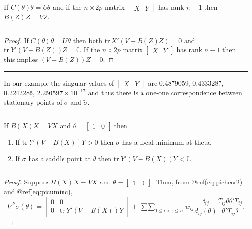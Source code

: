 \documentclass[
  12pt,
  letterpaper,
  DIV=11,
  numbers=noendperiod]{scrreprt}
\providecommand{\tightlist}{%
  \setlength{\itemsep}{0pt}\setlength{\parskip}{0pt}}\usepackage{longtable,booktabs,array}
\theoremstyle{remark}
\begin{document}
\label{pictaround}
If \(C(\theta)\theta=U\theta\) and if the \(n\times 2p\) matrix
\(\begin{bmatrix}X&Y\end{bmatrix}\) has rank \(n-1\) then \(B(Z)Z=VZ\).

\begin{center}\rule{0.5\linewidth}{0.5pt}\end{center}

\begin{proof}
If \(C(\theta)\theta=U\theta\) then both \(\text{tr}\ X'(V-B(Z)Z)=0\)
and \(\text{tr}\ Y'(V-B(Z))Z=0\). If the \(n\times 2p\) matrix
\(\begin{bmatrix}X&Y\end{bmatrix}\) has rank \(n-1\) then this implies
\((V-B(Z))Z=0\).
\end{proof}

\begin{center}\rule{0.5\linewidth}{0.5pt}\end{center}

In our example the singular values of
\(\begin{bmatrix}X&Y\end{bmatrix}\) are 0.4879059, 0.4333287, 0.2242285,
\ensuremath{2.256597\times 10^{-17}} and thus there is a one-one
correspondence between stationary points of \(\sigma\) and
\(\tilde\sigma\).

\begin{center}\rule{0.5\linewidth}{0.5pt}\end{center}

\label{picsecder}
If \(B(X)X=VX\) and \(\theta=\begin{bmatrix}1&0\end{bmatrix}\) then

\begin{enumerate}
\def\labelenumi{\arabic{enumi}.}
\tightlist
\item
  If \(\text{tr}\ Y'(V-B(X))Y > 0\) then \(\sigma\) has a local minimum
  at theta.
\item
  If \(\sigma\) has a saddle point at \(\theta\) then
  \(\text{tr}\ Y'(V-B(X))Y < 0\).
\end{enumerate}

\begin{center}\rule{0.5\linewidth}{0.5pt}\end{center}

\begin{proof}
Suppose \(B(X)X=VX\) and \(\theta=\begin{bmatrix}1&0\end{bmatrix}\).
Then, from @ref(eq:pichess2) and @ref(eq:picuminc), \[
\nabla^2\sigma(\theta)=\begin{bmatrix}0&0\\0&\text{tr}\ Y'(V-B(X))Y\end{bmatrix}+\mathop{\sum\sum}_{1\leq i<j\leq n}
w_{ij}\frac{\delta_{ij}}{d_{ij}(\theta)}\frac{T_{ij}\theta\theta'T_{ij}}{\theta'T_{ij}\theta}.
\]
\end{proof}
\end{document}

